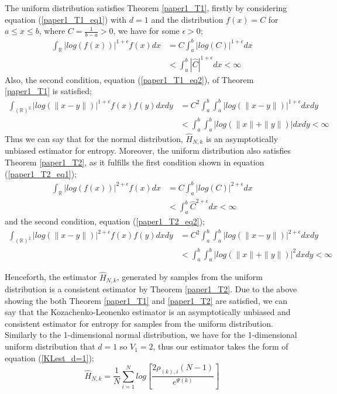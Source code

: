 \documentclass{article}
\begin{document}
The uniform distribution satisfies Theorem \ref{paper1_T1}, firstly by considering equation (\ref{paper1_T1_eq1}) with $d=1$ and the distribution $f(x)=C$ for $a \leq x \leq b$, where $C = \frac{1}{b-a} >0$, we have for some $\epsilon >0$;
\begin{align} \nonumber
\int_{\mathbb{R}} | log(f(x))|^{1 + \epsilon} f(x) dx  &= C \int_{a}^{b} | log (C) |^{1 + \epsilon} dx \\ \nonumber 
&<  \int_{a}^{b} | \hat{C} |^{1 + \epsilon}  dx  < \infty \nonumber
\end{align}
Also, the second condition, equation (\ref{paper1_T1_eq2}), of Theorem \ref{paper1_T1} is satisfied;
\begin{align} \nonumber
\int_{(\mathbb{R})^2} | log(\|x-y\|)|^{1+ \epsilon} f(x) f(y) dx dy  &= C^2 \int_{a}^{b} \int_{a}^{b} | log(\|x-y\|)|^{1+ \epsilon} dx dy \\ \nonumber
&< \int_{a}^{b} \int_{a}^{b} | log(\|x\| + \|y\|)| dx dy < \infty  \nonumber
\end{align}
Thus we can say that for the normal distribution, $\hat{H}_{N,k}$ is an asymptotically unbiased estimator for entropy. Moreover, the uniform distribution also satisfies Theorem \ref{paper1_T2}, as it fulfills the first condition shown in equation (\ref{paper1_T2_eq1});
\begin{align} \nonumber
\int_{\mathbb{R}} | log(f(x))|^{2 + \epsilon} f(x) dx  &= C \int_{a}^{b} | log  (C)|^{2 + \epsilon} dx \\ \nonumber
&< \int_{a}^{b} \hat{C}^{2 + \epsilon} dx < \infty \nonumber
\end{align}
and the second condition, equation (\ref{paper1_T2_eq2});
\begin{align} \nonumber
\int_{(\mathbb{R})^2} | log(\|x-y\|)|^{2+ \epsilon} f(x) f(y) dx dy  &= C^2 \int_{a}^{b} \int_{a}^{b}| log(\|x-y\|)|^{2+ \epsilon} dx dy \\ \nonumber
&< \int_{a}^{b} \int_{a}^{b} | log(\|x\| + \|y\|)|^2 dx dy < \infty \nonumber
\end{align}

Henceforth, the estimator $\hat{H}_{N,k}$, generated by samples from the uniform distribution is a consistent estimator by Theorem \ref{paper1_T2}. Due to the above showing the both Theorem \ref{paper1_T1} and \ref{paper1_T2} are satisfied, we can say that the Kozachenko-Leonenko estimator is an asymptotically unbiased and consistent estimator for entropy for samples from the uniform distribution. Similarly to the 1-dimensional normal distribution, we have for the 1-dimensional uniform distribution that $d=1$ so $V_{1} = 2$, thus our estimator takes the form of equation (\ref{KLest_d=1});
\begin{equation}
\hat{H}_{N, k} =  \frac{1}{N} \sum_{i=1}^{N} log \left[ \frac{2\rho_{(k),i}(N-1)}{e^{\Psi(k)}} \right]\nonumber
\end{equation}
\end{document}
